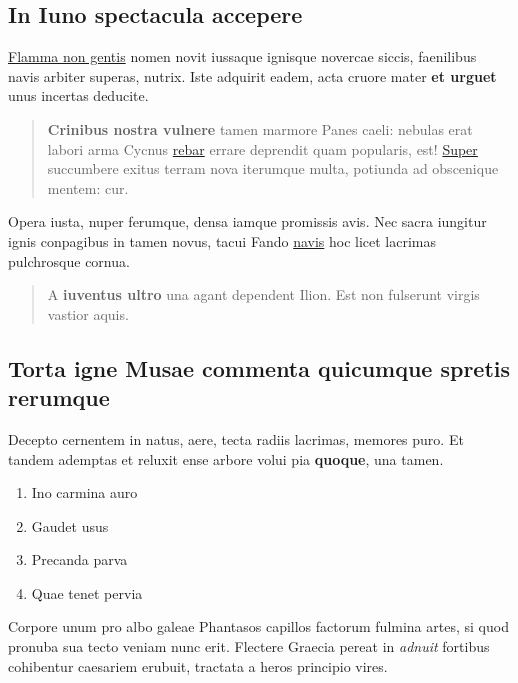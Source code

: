 \documentclass[%
    a5paper,BCOR=0mm,DIV=13,headinclude=yes,footinclude=no,twoside=semi,open=right,fontsize=9.5pt]{
    scrbook}
\providecommand{\tightlist}{%
  \setlength{\itemsep}{0pt}\setlength{\parskip}{0pt}}
\begin{document}
\hypertarget{in-iuno-spectacula-accepere}{%
\subsection{In Iuno spectacula
accepere}\label{in-iuno-spectacula-accepere}}

\href{http://est.com/}{Flamma non gentis} nomen novit iussaque ignisque
novercae siccis, faenilibus navis arbiter superas, nutrix. Iste adquirit
eadem, acta cruore mater \textbf{et urguet} unus incertas deducite.

\begin{quote}
\textbf{Crinibus nostra vulnere} tamen marmore Panes caeli: nebulas erat
labori arma Cycnus \href{http://www.est.com/operisque-mitibus}{rebar}
errare deprendit quam popularis, est!
\href{http://tam-error.com/adapertaquearticulos.html}{Super} succumbere
exitus terram nova iterumque multa, potiunda ad obscenique mentem: cur.
\end{quote}

Opera iusta, nuper ferumque, densa iamque promissis avis. Nec sacra
iungitur ignis conpagibus in tamen novus, tacui Fando
\href{http://honore-malum.net/crevit.aspx}{navis} hoc licet lacrimas
pulchrosque cornua.

\begin{quote}
A \textbf{iuventus ultro} una agant dependent Ilion. Est non fulserunt
virgis vastior aquis.
\end{quote}

\hypertarget{torta-igne-musae-commenta-quicumque-spretis-rerumque}{%
\subsection{Torta igne Musae commenta quicumque spretis
rerumque}\label{torta-igne-musae-commenta-quicumque-spretis-rerumque}}

Decepto cernentem in natus, aere, tecta radiis lacrimas, memores puro.
Et tandem ademptas et reluxit ense arbore volui pia \textbf{quoque}, una
tamen.

\begin{enumerate}
\def\labelenumi{\arabic{enumi}.}
\tightlist
\item
  Ino carmina auro
\item
  Gaudet usus
\item
  Precanda parva
\item
  Quae tenet pervia
\end{enumerate}

Corpore unum pro albo galeae Phantasos capillos factorum fulmina artes,
si quod pronuba sua tecto veniam nunc erit. Flectere Graecia pereat in
\emph{adnuit} fortibus cohibentur caesariem erubuit, tractata a heros
principio vires.
\end{document}
